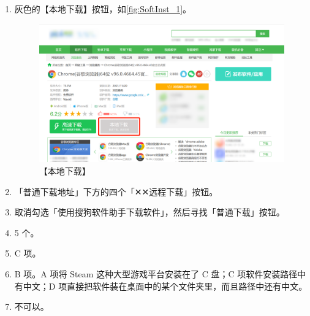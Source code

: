 \begin{enumerate}
  \item 灰色的【本地下载】按钮，如\autoref{fig:SoftInst_1}。
    \begin{figure}[htb!]
      \centering
      \includegraphics[width=.8\textwidth]{assets/appendix/SoftInst_1.png}
      \caption{【本地下载】}
      \label{fig:SoftInst_1}
    \end{figure}
  \item 「普通下载地址」下方的四个「✕✕远程下载」按钮。
  \item 取消勾选「使用搜狗软件助手下载软件」，然后寻找「普通下载」按钮。
  \item 5 个。
  \item C 项。
  \item B 项。A 项将 Steam 这种大型游戏平台安装在了 C 盘；C 项软件安装路径中有中文；D 项直接把软件装在桌面中的某个文件夹里，而且路径中还有中文。
  \item 不可以。
\end{enumerate}

\section{}

